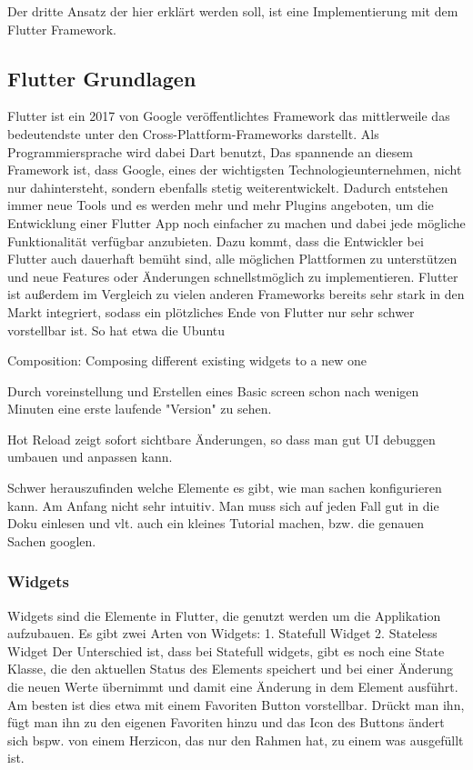 Der dritte Ansatz der hier erklärt werden soll, ist eine Implementierung mit dem Flutter Framework.

\subsection{Flutter Grundlagen}
Flutter ist ein 2017 von Google veröffentlichtes Framework das mittlerweile das bedeutendste unter den Cross-Plattform-Frameworks darstellt. Als Programmiersprache wird dabei Dart benutzt, Das spannende an diesem Framework ist, dass Google, eines der wichtigsten Technologieunternehmen, nicht nur dahintersteht, sondern  ebenfalls stetig weiterentwickelt. Dadurch entstehen immer neue Tools und es werden mehr und mehr Plugins angeboten, um die Entwicklung einer Flutter App noch einfacher zu machen und dabei jede mögliche Funktionalität verfügbar anzubieten. Dazu kommt, dass die Entwickler bei Flutter auch dauerhaft bemüht sind, alle möglichen Plattformen zu unterstützen und neue Features oder Änderungen schnellstmöglich zu implementieren.
Flutter ist außerdem im Vergleich zu vielen anderen Frameworks bereits sehr stark in den Markt integriert, sodass ein plötzliches Ende von Flutter nur sehr schwer vorstellbar ist. So hat etwa die Ubuntu

Composition: Composing different existing widgets to a new one

Durch voreinstellung und Erstellen eines Basic screen schon nach wenigen Minuten eine erste laufende "Version" zu sehen.

Hot Reload zeigt sofort sichtbare Änderungen, so dass man gut UI debuggen umbauen und anpassen kann.

Schwer herauszufinden welche Elemente es gibt, wie man sachen konfigurieren kann. Am Anfang nicht sehr intuitiv. Man muss sich auf jeden Fall gut in die Doku einlesen und vlt. auch ein kleines Tutorial machen, bzw. die genauen Sachen googlen.




\subsubsection{Widgets}
Widgets sind die Elemente in Flutter, die genutzt werden um die Applikation aufzubauen.
Es gibt zwei Arten von Widgets:
1. Statefull Widget
2. Stateless Widget
Der Unterschied ist, dass bei Statefull widgets, gibt es noch eine State Klasse, die den aktuellen Status des Elements speichert und bei einer Änderung die neuen Werte übernimmt und damit eine Änderung in dem Element ausführt. Am besten ist dies etwa mit einem Favoriten Button vorstellbar. Drückt man ihn, fügt man ihn zu den eigenen Favoriten hinzu und das Icon des Buttons ändert sich bspw. von einem Herzicon, das nur den Rahmen hat, zu einem was ausgefüllt ist.

